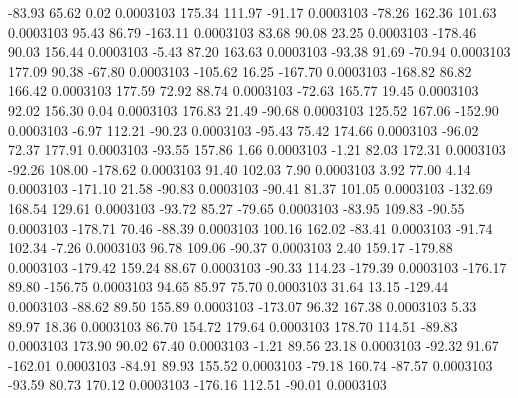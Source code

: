       -83.93       65.62        0.02     0.0003103
      175.34      111.97      -91.17     0.0003103
      -78.26      162.36      101.63     0.0003103
       95.43       86.79     -163.11     0.0003103
       83.68       90.08       23.25     0.0003103
     -178.46       90.03      156.44     0.0003103
       -5.43       87.20      163.63     0.0003103
      -93.38       91.69      -70.94     0.0003103
      177.09       90.38      -67.80     0.0003103
     -105.62       16.25     -167.70     0.0003103
     -168.82       86.82      166.42     0.0003103
      177.59       72.92       88.74     0.0003103
      -72.63      165.77       19.45     0.0003103
       92.02      156.30        0.04     0.0003103
      176.83       21.49      -90.68     0.0003103
      125.52      167.06     -152.90     0.0003103
       -6.97      112.21      -90.23     0.0003103
      -95.43       75.42      174.66     0.0003103
      -96.02       72.37      177.91     0.0003103
      -93.55      157.86        1.66     0.0003103
       -1.21       82.03      172.31     0.0003103
      -92.26      108.00     -178.62     0.0003103
       91.40      102.03        7.90     0.0003103
        3.92       77.00        4.14     0.0003103
     -171.10       21.58      -90.83     0.0003103
      -90.41       81.37      101.05     0.0003103
     -132.69      168.54      129.61     0.0003103
      -93.72       85.27      -79.65     0.0003103
      -83.95      109.83      -90.55     0.0003103
     -178.71       70.46      -88.39     0.0003103
      100.16      162.02      -83.41     0.0003103
      -91.74      102.34       -7.26     0.0003103
       96.78      109.06      -90.37     0.0003103
        2.40      159.17     -179.88     0.0003103
     -179.42      159.24       88.67     0.0003103
      -90.33      114.23     -179.39     0.0003103
     -176.17       89.80     -156.75     0.0003103
       94.65       85.97       75.70     0.0003103
       31.64       13.15     -129.44     0.0003103
      -88.62       89.50      155.89     0.0003103
     -173.07       96.32      167.38     0.0003103
        5.33       89.97       18.36     0.0003103
       86.70      154.72      179.64     0.0003103
      178.70      114.51      -89.83     0.0003103
      173.90       90.02       67.40     0.0003103
       -1.21       89.56       23.18     0.0003103
      -92.32       91.67     -162.01     0.0003103
      -84.91       89.93      155.52     0.0003103
      -79.18      160.74      -87.57     0.0003103
      -93.59       80.73      170.12     0.0003103
     -176.16      112.51      -90.01     0.0003103
